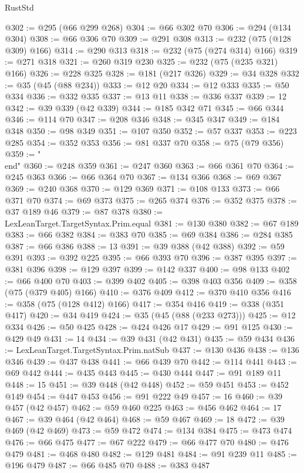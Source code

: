 \begin{lexlean}{RustStd}
\begin{coremodule}
@302 := @295 (@66 @299 @268)
@304 := @66 @302 @70
@306 := @294 (@134 @304)
@308 := @66 @306 @70
@309 := @291 @308
@313 := @232 (@75 (@128 @309) @166)
@314 := @290 @313
@318 := @232 (@75 (@274 @314) @166)
@319 := @271 @318
@321 := @260 @319 @230
@325 := @232 (@75 (@235 @321) @166)
@326 := @228 @325
@328 := @181 (@217 @326)
@329 := @34 @328
@332 := @35 (@45 (@88 @234))
@333 := @12 @20
@334 := @12 @333
@335 := @50 @334
@336 := @332 @335
@337 := @13 @11
@338 := @336 @337
@339 := 12
@342 := @39 @339 (@42 @339)
@344 := @185 @342 @71
@345 := @66 @344
@346 := @114 @70
@347 := @208 @346
@348 := @345 @347
@349 := @184 @348
@350 := @98 @349
@351 := @107 @350
@352 := @57 @337
@353 := @223 @285
@354 := @352 @353
@356 := @81 @337 @70
@358 := @75 (@79 @356)
@359 := "\\end"
@360 := @248 @359
@361 := @247 @360
@363 := @66 @361 @70
@364 := @245 @363
@366 := @66 @364 @70
@367 := @134 @366
@368 := @69 @367
@369 := @240 @368
@370 := @129 @369
@371 := @108 @133
@373 := @66 @371 @70
@374 := @69 @373
@375 := @265 @374
@376 := @352 @375
@378 := @37 @189 @46
@379 := @87 @378
@380 := LexLeanTarget.TargetSyntax.Prim.equal
@381 := @130 @380
@382 := @67 @189
@383 := @66 @382
@384 := @383 @70
@385 := @69 @384
@386 := @284 @385
@387 := @66 @386
@388 := 13
@391 := @39 @388 (@42 @388)
@392 := @59 @391
@393 := @392 @225
@395 := @66 @393 @70
@396 := @387 @395
@397 := @381 @396
@398 := @129 @397
@399 := @142 @337
@400 := @98 @133
@402 := @66 @400 @70
@403 := @399 @402
@405 := @398 @403 @356
@409 := @358 (@75 (@379 @405) @166)
@410 := @376 @409
@412 := @370 @410 @356
@416 := @358 (@75 (@128 @412) @166)
@417 := @354 @416
@419 := @338 (@351 @417)
@420 := @34 @419
@424 := @35 (@45 (@88 (@233 @273)))
@425 := @12 @334
@426 := @50 @425
@428 := @424 @426 @17
@429 := @91 @125
@430 := @429 @49
@431 := 14
@434 := @39 @431 (@42 @431)
@435 := @59 @434
@436 := LexLeanTarget.TargetSyntax.Prim.natSub
@437 := @130 @436
@438 := @136 @346
@439 := @437 @438
@441 := @66 @439 @70
@442 := @114 @441
@443 := @69 @442
@444 := @435 @443
@445 := @430 @444
@447 := @91 @189 @11
@448 := 15
@451 := @39 @448 (@42 @448)
@452 := @59 @451
@453 := @452 @149
@454 := @447 @453
@456 := @91 @222 @49
@457 := 16
@460 := @39 @457 (@42 @457)
@462 := @59 @460 @225
@463 := @456 @462
@464 := 17
@467 := @39 @464 (@42 @464)
@468 := @59 @467
@469 := 18
@472 := @39 @469 (@42 @469)
@473 := @59 @472
@474 := @134 @384
@475 := @473 @474
@476 := @66 @475
@477 := @67 @222
@479 := @66 @477 @70
@480 := @476 @479
@481 := @468 @480
@482 := @129 @481
@484 := @91 @239 @11
@485 := @196 @479
@487 := @66 @485 @70
@488 := @383 @487

\end{coremodule}
\end{lexlean}
